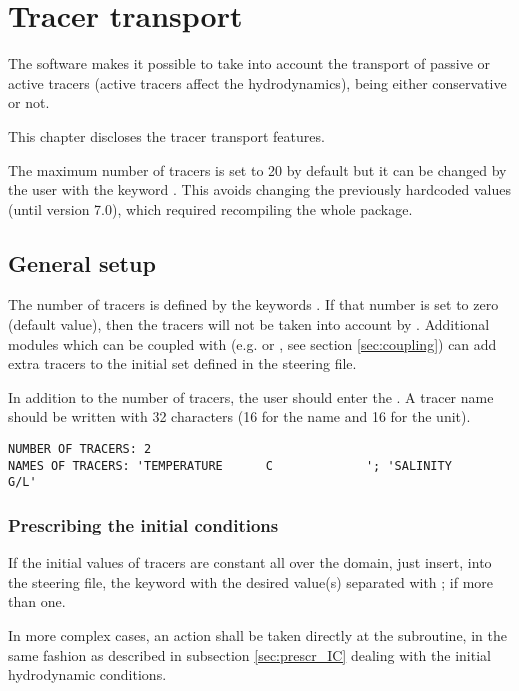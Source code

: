 \chapter{Tracer transport}

The  software makes it possible to take into account the transport of
passive or active tracers (active tracers affect the hydrodynamics), being
either conservative or not.

This chapter discloses the tracer transport features.

The maximum number of tracers is set to 20 by default but it can be changed by
the user with the keyword .
This avoids changing the previously hardcoded values (until version 7.0),
which required recompiling the whole package.

\section{General setup}

The number of tracers is defined by the keywords . If
that number is set to zero (default value), then the tracers will not be taken
into account by .
Additional modules which can be coupled with 
(e.g. \waqtel or \gaia, see section \ref{sec:coupling})
can add extra tracers to the initial set defined in the 
steering file.

In addition to the number of tracers, the user should enter the . A tracer name should be written with 32 characters
(16 for the name and 16 for the unit).

\begin{lstlisting}[language=TelemacCas]
NUMBER OF TRACERS: 2
NAMES OF TRACERS: 'TEMPERATURE      C             '; 'SALINITY                     G/L'
\end{lstlisting}


\subsection{Prescribing the initial conditions}

If the initial values of tracers are constant all over the domain, just insert,
into the steering file, the keyword  with the
desired value(s) separated with ; if more than one.

In more complex cases, an action shall be taken directly at the 
subroutine, in the same fashion as described in subsection \ref{sec:prescr_IC}
dealing with the initial hydrodynamic conditions.

